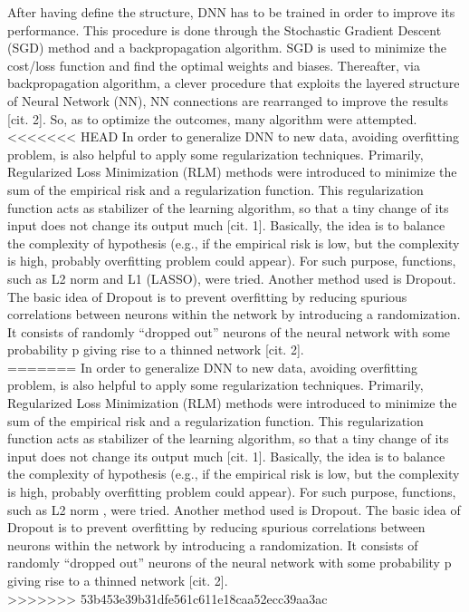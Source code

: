 \documentclass[prl,twocolumn]{revtex4-1}
\begin{document}
After having define the structure, DNN has to be trained in order to improve its performance.  This procedure is done through the Stochastic Gradient Descent (SGD) method and a backpropagation algorithm. SGD is used to minimize the cost/loss function and find the optimal weights and biases. Thereafter, via backpropagation algorithm, a clever procedure that exploits the layered structure of Neural Network (NN), NN connections are rearranged to improve the results [cit. 2]. So, as to optimize the outcomes, many algorithm were attempted. \\
<<<<<<< HEAD
In order to generalize DNN to new data, avoiding overfitting problem, is also helpful to apply some regularization techniques. Primarily, Regularized Loss Minimization (RLM) methods were introduced to minimize the sum of the empirical risk and a regularization function. This regularization function acts as stabilizer of the learning algorithm, so that a tiny change of its input does not change its output much [cit. 1]. Basically, the idea is to balance the complexity of hypothesis (e.g., if the empirical risk is low, but the complexity is high, probably overfitting problem could appear). For such purpose, functions, such as L2 norm and L1 (LASSO), were tried. Another method used is Dropout. The basic idea of Dropout is to prevent overfitting by reducing spurious correlations between neurons within the network by introducing a randomization. It consists of randomly “dropped out” neurons of the neural network with some probability p giving rise to a thinned network [cit. 2]. \\
=======
In order to generalize DNN to new data, avoiding overfitting problem, is also helpful to apply some regularization techniques. Primarily, Regularized Loss Minimization (RLM) methods were introduced to minimize the sum of the empirical risk and a regularization function. This regularization function acts as stabilizer of the learning algorithm, so that a tiny change of its input does not change its output much [cit. 1]. Basically, the idea is to balance the complexity of hypothesis (e.g., if the empirical risk is low, but the complexity is high, probably overfitting problem could appear). For such purpose, functions, such as L2 norm , were tried. Another method used is Dropout. The basic idea of Dropout is to prevent overfitting by reducing spurious correlations between neurons within the network by introducing a randomization. It consists of randomly “dropped out” neurons of the neural network with some probability p giving rise to a thinned network [cit. 2]. \\
>>>>>>> 53b453e39b31dfe561c611e18caa52ecc39aa3ac
\end{document}
